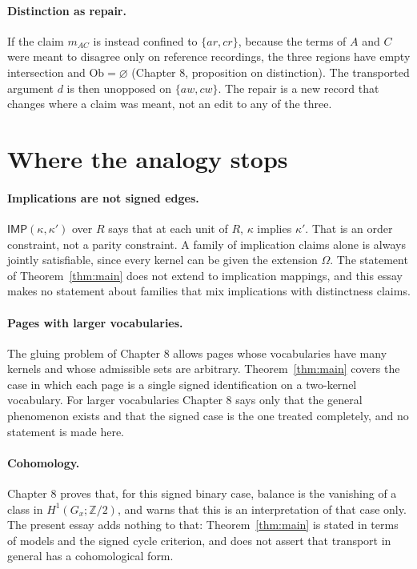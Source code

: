 \documentclass[11pt]{article}
\theoremstyle{plain}
\theoremstyle{definition}
\theoremstyle{remark}
\newcommand{\Om}{\Omega}
\newcommand{\Ob}{\mathrm{Ob}}
\newcommand{\IMP}{\mathsf{IMP}}
\begin{document}
\paragraph{Distinction as repair.} If the claim $m_{AC}$ is instead confined to $\{ar,cr\}$, because the terms of $A$ and $C$ were meant to disagree only on reference recordings, the three regions have empty intersection and $\Ob=\varnothing$ (Chapter 8, proposition on distinction). The transported argument $d$ is then unopposed on $\{aw,cw\}$. The repair is a new record that changes where a claim was meant, not an edit to any of the three.

\section{Where the analogy stops}\label{sec:stops}

\paragraph{Implications are not signed edges.} $\IMP(\kappa,\kappa')$ over $R$ says that at each unit of $R$, $\kappa$ implies $\kappa'$. That is an order constraint, not a parity constraint. A family of implication claims alone is always jointly satisfiable, since every kernel can be given the extension $\Om$. The statement of Theorem~\ref{thm:main} does not extend to implication mappings, and this essay makes no statement about families that mix implications with distinctness claims.

\paragraph{Pages with larger vocabularies.} The gluing problem of Chapter 8 allows pages whose vocabularies have many kernels and whose admissible sets are arbitrary. Theorem~\ref{thm:main} covers the case in which each page is a single signed identification on a two-kernel vocabulary. For larger vocabularies Chapter 8 says only that the general phenomenon exists and that the signed case is the one treated completely, and no statement is made here.

\paragraph{Cohomology.} Chapter 8 proves that, for this signed binary case, balance is the vanishing of a class in $H^1(G_x;\mathbb Z/2)$, and warns that this is an interpretation of that case only. The present essay adds nothing to that: Theorem~\ref{thm:main} is stated in terms of models and the signed cycle criterion, and does not assert that transport in general has a cohomological form.
\end{document}
